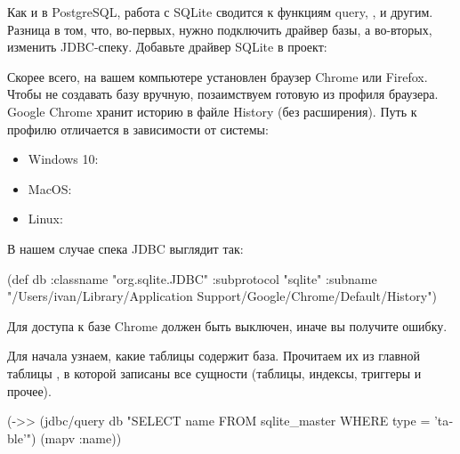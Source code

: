 Как и в PostgreSQL, работа с SQLite сводится к функциям query, ,  и другим. Разница в том, что, во-первых, нужно подключить драйвер базы, а во-вторых, изменить JDBC-спеку. Добавьте драйвер SQLite в проект:

\begin{english}
  \begin{clojure}
  \end{clojure}
\end{english}

Скорее всего, на вашем компьютере установлен браузер Chrome или Firefox. Чтобы не создавать базу вручную, позаимствуем готовую из профиля браузера. Google Chrome хранит историю в файле History (без расширения). Путь к профилю отличается в зависимости от системы:

\begin{itemize}

\item
  Windows 10: 

\item
  MacOS: 

\item
 Linux: 

\end{itemize}

В нашем случае спека JDBC выглядит так:

\begin{english}
  \begin{clojure}
(def db
  {:classname "org.sqlite.JDBC"
   :subprotocol "sqlite"
   :subname "/Users/ivan/Library/Application Support/Google/Chrome/Default/History"})
  \end{clojure}
\end{english}

Для доступа к базе Chrome должен быть выключен, иначе вы получите ошибку.

Для начала узнаем, какие таблицы содержит база. Прочитаем их из главной таблицы , в которой записаны все сущности (таблицы, индексы, триггеры и прочее).

\begin{english}
  \begin{clojure}
(->> (jdbc/query db "SELECT name FROM sqlite_master WHERE type = 'table'")
     (mapv :name))
  \end{clojure}
\end{english}

